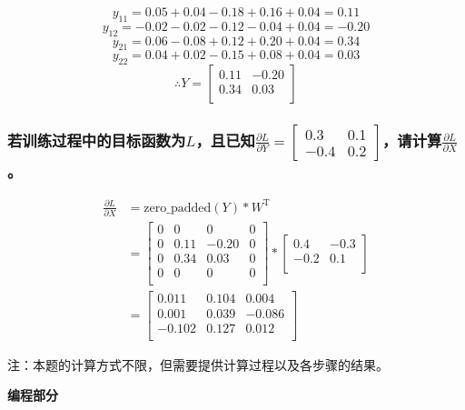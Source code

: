 \documentclass[a4paper]{article}
\begin{document}
\[y_{11} = 0.05 + 0.04 - 0.18 + 0.16 + 0.04 = 0.11\]
\[y_{12} = -0.02 - 0.02 - 0.12 - 0.04 + 0.04 = -0.20\]
\[y_{21} = 0.06 - 0.08 + 0.12 + 0.20 + 0.04 = 0.34\]
\[y_{22} = 0.04 + 0.02 - 0.15 + 0.08 + 0.04 = 0.03\]
\[\therefore Y = \begin{bmatrix}
                0.11 & -0.20 \\
                0.34 & 0.03 \\
                \end{bmatrix}\]

\subsubsection{若训练过程中的目标函数为$L$，且已知$\frac{\partial L}{\partial Y}=\left[ \begin{array}{cc}
    0.3 & 0.1 \\
    -0.4 & 0.2
\end{array} \right]$，请计算$\frac{\partial L}{\partial X}$。
}
\begin{align*}
    \frac{\partial L}{\partial X} &= \mathrm{zero\_padded}(Y) * W^{\mathrm{T}} \\
    &= \begin{bmatrix}
        0 & 0 & 0 & 0 \\
        0 & 0.11 & -0.20 & 0 \\
        0 & 0.34 & 0.03 & 0 \\
        0 & 0 & 0 & 0 \\
    \end{bmatrix} *
    \begin{bmatrix}
        0.4 & -0.3 \\
        -0.2 & 0.1 \\
    \end{bmatrix} \\
    &= \begin{bmatrix}
        0.011 & 0.104 & 0.004 \\
        0.001 & 0.039 & -0.086 \\
        -0.102 & 0.127 &0.012 \\
    \end{bmatrix}
\end{align*}

注：本题的计算方式不限，但需要提供计算过程以及各步骤的结果。
\vspace{6mm}

\centerline{\textbf{\Large{编程部分}}}
\vspace{3mm}
\end{document}
